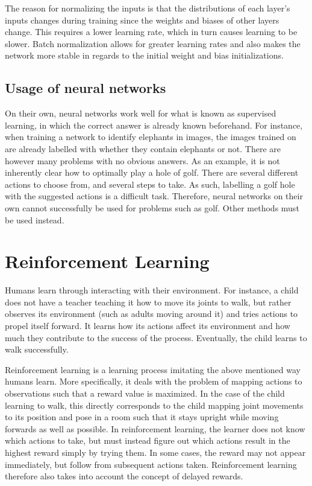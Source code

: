 \documentclass{kththesis}
\begin{document}
The reason for normalizing the inputs is that the distributions of each layer's inputs changes during training since the weights and biases of other layers change. This requires a lower learning rate, which in turn causes learning to be slower. Batch normalization allows for greater learning rates and also makes the network more stable in regards to the initial weight and bias initializations. \parencite{ioffe2015batch}

\subsection{Usage of neural networks}
On their own, neural networks work well for what is known as supervised learning, in which the correct answer is already known beforehand. For instance, when training a network to identify elephants in images, the images trained on are already labelled with whether they contain elephants or not. There are however many problems with no obvious answers. As an example, it is not inherently clear how to optimally play a hole of golf. There are several different actions to choose from, and several steps to take. As such, labelling a golf hole with the suggested actions is a difficult task. Therefore, neural networks on their own cannot successfully be used for problems such as golf. Other methods must be used instead.

\section{Reinforcement Learning}
\label{sec:reinforcementlearning}
Humans learn through interacting with their environment. For instance, a child does not have a teacher teaching it how to move its joints to walk, but rather observes its environment (such as adults moving around it) and tries actions to propel itself forward. It learns how its actions affect its environment and how much they contribute to the success of the process. Eventually, the child learns to walk successfully. 

Reinforcement learning is a learning process imitating the above mentioned way humans learn. More specifically, it deals with the problem of mapping actions to observations such that a reward value is maximized. In the case of the child learning to walk, this directly corresponds to the child mapping joint movements to its position and pose in a room such that it stays upright while moving forwards as well as possible. In reinforcement learning, the learner does not know which actions to take, but must instead figure out which actions result in the highest reward simply by trying them. In some cases, the reward may not appear immediately, but follow from subsequent actions taken. Reinforcement learning therefore also takes into account the concept of delayed rewards. \parencite{sutton1998introduction}
\end{document}
